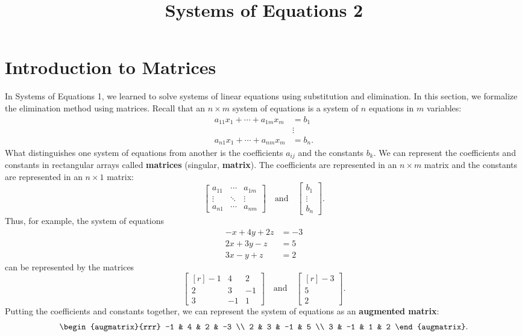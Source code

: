 \documentclass{article}
\title{Systems of Equations 2}
\author{}
\date{}
\begin{document}
\maketitle


\section{Introduction to Matrices}\label{sec:matrices}

In Systems of Equations 1, we learned to solve systems of linear equations using substitution and elimination. In this section, we formalize the elimination method using matrices. Recall that an \(n \times m\) system of equations is a system of \(n\) equations in \(m\) variables:
\begin{align*}
a_{11}x_1 + \cdots + a_{1m}x_m &= b_1 \\
&\vdots \\
a_{n1}x_1 + \cdots + a_{nm}x_m &= b_n.
\end{align*}
What distinguishes one system of equations from another is the coefficients \(a_{ij}\) and the constants \(b_k\). We can represent the coefficients and constants in rectangular arrays called \textbf{matrices} (singular, \textbf{matrix}). The coefficients are represented in an \(n \times m\) matrix and the constants are represented in an \(n \times 1\) matrix:
\[\begin{bmatrix}
a_{11} & \cdots & a_{1m} \\
\vdots & \ddots & \vdots \\
a_{n1} & \cdots & a_{nm}
\end{bmatrix} \quad \text{and} \quad \begin{bmatrix}
b_1 \\
\vdots \\
b_n
\end{bmatrix}.\]
Thus, for example, the system of equations
\begin{align*}
-x + 4y + 2z &= -3 \\
2x + 3y - z &= 5 \\
3x - y + z &= 2
\end{align*}
can be represented by the matrices
\[\begin{bmatrix*}[r]
-1 & 4 & 2 \\
2 & 3 & -1 \\
3 & -1 & 1
\end{bmatrix*} \quad \text{and} \quad \begin{bmatrix*}[r]
-3 \\
5 \\
2
\end{bmatrix*}.\]
Putting the coefficients and constants together, we can represent the system of equations as an \textbf{augmented matrix}:
\[\begin{augmatrix}{rrr}
-1 & 4 & 2 & -3 \\
2 & 3 & -1 & 5 \\
3 & -1 & 1 & 2
\end{augmatrix}.\]
\end{document}
